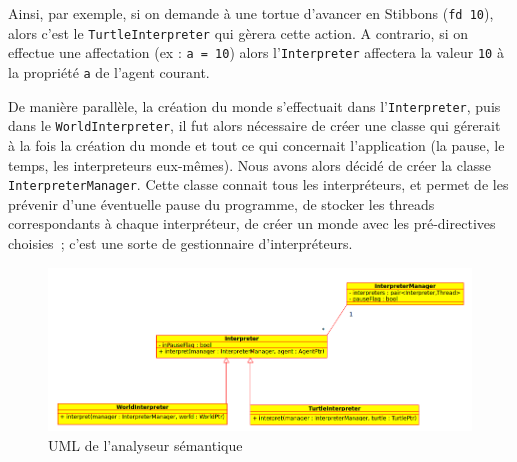 Ainsi, par exemple, si on demande à une tortue d'avancer en Stibbons (\verb|fd 10|), alors c'est le \verb|TurtleInterpreter| qui gèrera cette action.
A contrario, si on effectue une affectation (ex : \verb|a = 10|) alors l'\verb|Interpreter| affectera la valeur \verb|10| à la propriété \verb|a| de l'agent courant.

De manière parallèle, la création du monde s'effectuait dans l'\verb|Interpreter|, puis dans le \verb|WorldInterpreter|, il fut alors nécessaire de créer une classe qui gérerait à la fois la création du monde et tout ce qui concernait l'application (la pause, le temps, les interpreteurs eux-mêmes). Nous avons alors décidé de créer la classe \verb|InterpreterManager|.
Cette classe connait tous les interpréteurs, et permet de les prévenir d'une éventuelle pause du programme, de stocker les threads correspondants à chaque interpréteur, de créer un monde avec les pré-directives choisies~; c'est une sorte de gestionnaire d'interpréteurs.

\begin{figure}[h]
\caption{\label{interpreterUML} UML de l'analyseur sémantique}
\includegraphics[scale=0.5]{doc/report/uml/interpreterUML.png}
\end{figure}
